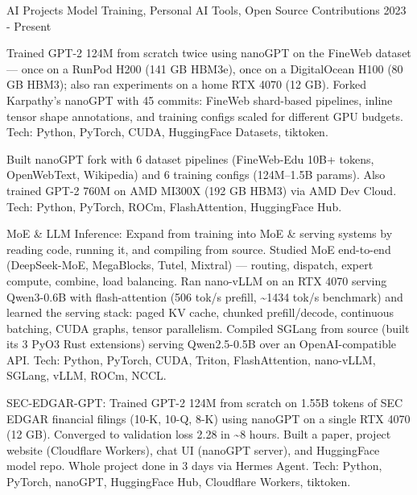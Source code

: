 
\begin{cventries}

  \cventry
    {AI Projects} %
    {Model Training, Personal AI Tools, Open Source Contributions} %
    {} %
    {2023 - Present} %
    {
      \begin{cvitems} %
        \item {Trained GPT-2 124M from scratch twice using nanoGPT on the FineWeb dataset — once on a RunPod H200 (141 GB HBM3e), once on a DigitalOcean H100 (80 GB HBM3); also ran experiments on a home RTX 4070 (12 GB). Forked Karpathy's nanoGPT with 45 commits: FineWeb shard-based pipelines, inline tensor shape annotations, and training configs scaled for different GPU budgets. Tech: Python, PyTorch, CUDA, HuggingFace Datasets, tiktoken.}
        \item {Built nanoGPT fork with 6 dataset pipelines (FineWeb-Edu 10B+ tokens, OpenWebText, Wikipedia) and 6 training configs (124M–1.5B params). Also trained GPT-2 760M on AMD MI300X (192 GB HBM3) via AMD Dev Cloud. Tech: Python, PyTorch, ROCm, FlashAttention, HuggingFace Hub.}
        \item {MoE \& LLM Inference: Expand from training into MoE \& serving systems by reading code, running it, and compiling from source. Studied MoE end-to-end (DeepSeek-MoE, MegaBlocks, Tutel, Mixtral) — routing, dispatch, expert compute, combine, load balancing. Ran nano-vLLM on an RTX 4070 serving Qwen3-0.6B with flash-attention (506 tok/s prefill, \textasciitilde1434 tok/s benchmark) and learned the serving stack: paged KV cache, chunked prefill/decode, continuous batching, CUDA graphs, tensor parallelism. Compiled SGLang from source (built its 3 PyO3 Rust extensions) serving Qwen2.5-0.5B over an OpenAI-compatible API. Tech: Python, PyTorch, CUDA, Triton, FlashAttention, nano-vLLM, SGLang, vLLM, ROCm, NCCL.}
        \item {SEC-EDGAR-GPT: Trained GPT-2 124M from scratch on 1.55B tokens of SEC EDGAR financial filings (10-K, 10-Q, 8-K) using nanoGPT on a single RTX 4070 (12 GB). Converged to validation loss 2.28 in \textasciitilde8 hours. Built a paper, project website (Cloudflare Workers), chat UI (nanoGPT server), and HuggingFace model repo. Whole project done in 3 days via Hermes Agent. Tech: Python, PyTorch, nanoGPT, HuggingFace Hub, Cloudflare Workers, tiktoken.}

\end{cvitems}}
\end{cventries}
